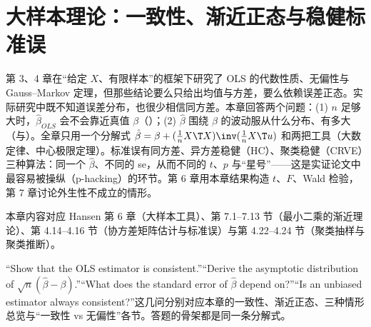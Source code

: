 \chapter{大样本理论：一致性、渐近正态与稳健标准误}
\label{ch:U05a-asym}

第 3、4 章在“给定 $X$、有限样本”的框架下研究了 OLS 的代数性质、无偏性与 Gauss--Markov 定理，但那些结论要么只给出均值与方差，要么依赖误差正态。实际研究中既不知道误差分布，也很少相信同方差。本章回答两个问题：(1) $n$ 足够大时，$\hat\beta_{OLS}$ 会不会靠近真值 $\beta$（）；(2) $\hat\beta$ 围绕 $\beta$ 的波动服从什么分布、有多大（与）。全章只用一个分解式 $\hat\beta=\beta+(\frac1nX\T X)\inv(\frac1nX\T u)$ 和两把工具（大数定律、中心极限定理）。标准误有同方差、异方差稳健（HC）、聚类稳健（CRVE）三种算法：同一个 $\hat\beta$、不同的 se，从而不同的 $t$、$p$ 与“星号”——这是实证论文中最容易被操纵（p-hacking）的环节。第 6 章用本章结果构造 $t$、$F$、Wald 检验，第 7 章讨论外生性不成立的情形。

\begin{center}
\end{center}

本章内容对应 Hansen 第 6 章（大样本工具）、第 7.1--7.13 节（最小二乘的渐近理论）、第 4.14--4.16 节（协方差矩阵估计与标准误）与第 4.22--4.24 节（聚类抽样与聚类推断）。

\begin{keypt}[英文试卷的常见问法]
“Show that the OLS estimator is consistent.”“Derive the asymptotic distribution of \mbox{$\sqrt n(\hat\beta-\beta)$}.”“What does the standard error of $\hat\beta$ depend on?”“Is an unbiased estimator always consistent?”这几问分别对应本章的一致性、渐近正态、三种情形总览与“一致性 vs 无偏性”各节。答题的骨架都是同一条分解式。
\end{keypt}

